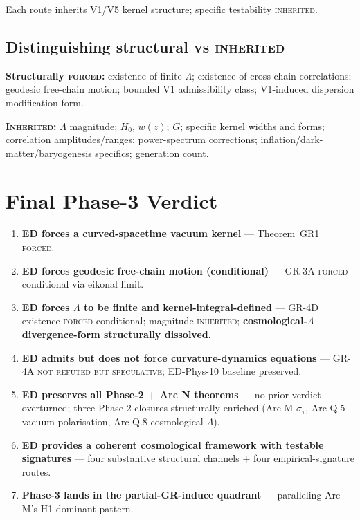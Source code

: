 \documentclass[11pt,a4paper]{article}
\begin{document}
Each route inherits V1/V5 kernel structure; specific testability \textsc{inherited}.

\subsection{Distinguishing structural vs \textsc{inherited}}

\textbf{Structurally \textsc{forced}:} existence of finite $\Lambda$; existence of cross-chain correlations; geodesic free-chain motion; bounded V1 admissibility class; V1-induced dispersion modification form.

\textbf{\textsc{Inherited}:} $\Lambda$ magnitude; $H_0$, $w(z)$; $G$; specific kernel widths and forms; correlation amplitudes/ranges; power-spectrum corrections; inflation/dark-matter/baryogenesis specifics; generation count.

\section{Final Phase-3 Verdict}

\begin{enumerate}
  \item \textbf{ED forces a curved-spacetime vacuum kernel} --- Theorem~GR1 \textsc{forced}.
  \item \textbf{ED forces geodesic free-chain motion (conditional)} --- GR-3A \textsc{forced}-conditional via eikonal limit.
  \item \textbf{ED forces $\Lambda$ to be finite and kernel-integral-defined} --- GR-4D existence \textsc{forced}-conditional; magnitude \textsc{inherited}; \textbf{cosmological-$\Lambda$ divergence-form structurally dissolved}.
  \item \textbf{ED admits but does not force curvature-dynamics equations} --- GR-4A \textsc{not refuted but speculative}; ED-Phys-10 baseline preserved.
  \item \textbf{ED preserves all Phase-2 + Arc N theorems} --- no prior verdict overturned; three Phase-2 closures structurally enriched (Arc M $\sigma_\tau$, Arc Q.5 vacuum polarisation, Arc Q.8 cosmological-$\Lambda$).
  \item \textbf{ED provides a coherent cosmological framework with testable signatures} --- four substantive structural channels + four empirical-signature routes.
  \item \textbf{Phase-3 lands in the partial-GR-induce quadrant} --- paralleling Arc M's H1-dominant pattern.
\end{enumerate}
\end{document}
